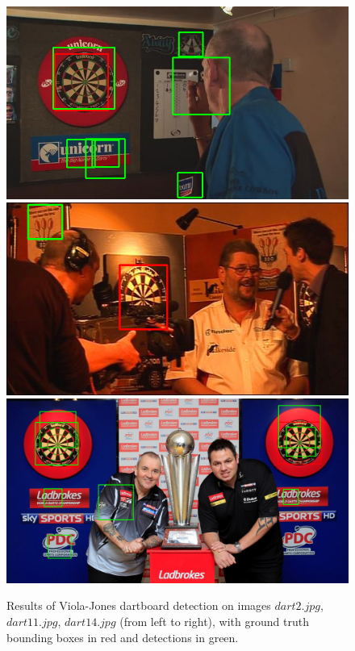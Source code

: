 \documentclass[11pt]{article}
\begin{document}
\begin{figure}[h]
\centering
\includegraphics[height=0.18\textwidth]{figures/02_vj_dartboards/dart2_true_pred_vj_dartboards.png}
\includegraphics[height=0.18\textwidth]{figures/02_vj_dartboards/dart11_true_pred_vj_dartboards.png}
\includegraphics[height=0.18\textwidth]{figures/02_vj_dartboards/dart14_true_pred_vj_dartboards.png}
\caption{Results of Viola-Jones dartboard detection on images $dart2.jpg$, $dart11.jpg$, $dart14.jpg$ (from left to right), with ground truth bounding boxes in red and detections in green.}
\label{vj_dartboards_images}
\end{figure}

\FloatBarrier
\end{document}
